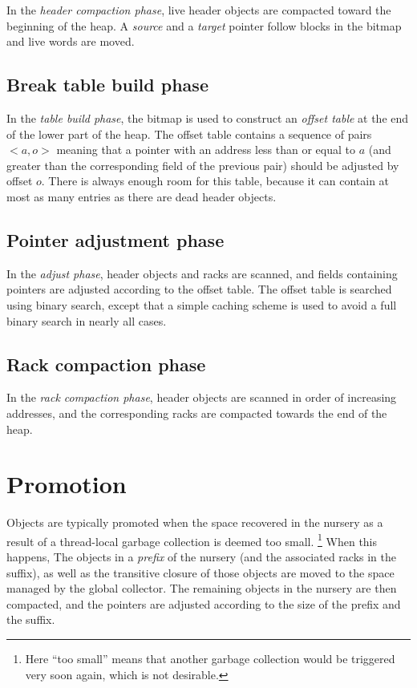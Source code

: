 In the \emph{header compaction phase}, live header objects are compacted
toward the beginning of the heap.  A \emph{source} and a \emph{target}
pointer follow blocks in the bitmap and live words are moved. 

\subsection{Break table build phase}
\label{sec-garbage-collection-break-table-build-phase}

In the \emph{table build phase}, the bitmap is used to construct an
\emph{offset table} at the end of the lower part of the heap.  The
offset table contains a sequence of pairs $<a,o>$ meaning that a
pointer with an address less than or equal to $a$ (and greater than
the corresponding field of the previous pair) should be adjusted by
offset $o$.  There is always enough room for this table, because it
can contain at most as many entries as there are dead header objects.  

\subsection{Pointer adjustment phase}

In the \emph{adjust phase}, header objects and racks are
scanned, and fields containing pointers are adjusted according to the
offset table.  The offset table is searched using binary search,
except that a simple caching scheme is used to avoid a full binary
search in nearly all cases. 

\subsection{Rack compaction phase}
\label{sec-garbage-collection-rack-compaction-phase}

In the \emph{rack compaction phase}, header objects are scanned in
order of increasing addresses, and the corresponding racks
are compacted towards the end of the heap.

\section{Promotion}
\label{sec-garbage-collection-promotion}

Objects are typically promoted when the space recovered in the nursery
as a result of a thread-local garbage collection is deemed too small.%
\footnote{Here ``too small'' means that another garbage collection
  would be triggered very soon again, which is not desirable.}  When
this happens, The objects in a \emph{prefix} of the nursery (and the
associated racks in the suffix), as well as the transitive closure of
those objects are moved to the space managed by the global collector.
The remaining objects in the nursery are then compacted, and the
pointers are adjusted according to the size of the prefix and the
suffix.


